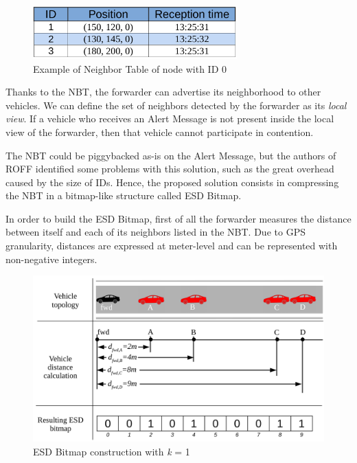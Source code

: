 		\begin{figure}[H]
			\centering
			\includegraphics[width=0.7\textwidth]{immagini/nbt}
			\caption{Example of Neighbor Table of node with ID 0}
			\label{fig:nbt}
		\end{figure}
		Thanks to the NBT, the forwarder can advertise its neighborhood to other vehicles. We can define the set of neighbors detected by the forwarder as its \textit{local view}. If a vehicle who receives an Alert Message is not present inside the local view of the forwarder, then that vehicle cannot participate in contention.
		
		
		The NBT could be piggybacked as-is on the Alert Message, but the authors of ROFF identified some problems with this solution, such as the great overhead caused by the size of IDs. Hence, the proposed solution consists in compressing the NBT in a bitmap-like structure called ESD Bitmap. 
		
		
		In order to build the ESD Bitmap, first of all the forwarder measures the distance between itself and each of its neighbors listed in the NBT. Due to GPS granularity, distances are expressed at meter-level and can be represented with non-negative integers.
		
		\begin{figure}[H]
			\centering
			\includegraphics[width=\textwidth]{immagini/esdBitmapConstruction}
			\caption{ESD Bitmap construction with \textit{k} = 1}
			\label{fig:esdBitmapConstruction}
		\end{figure}
		
